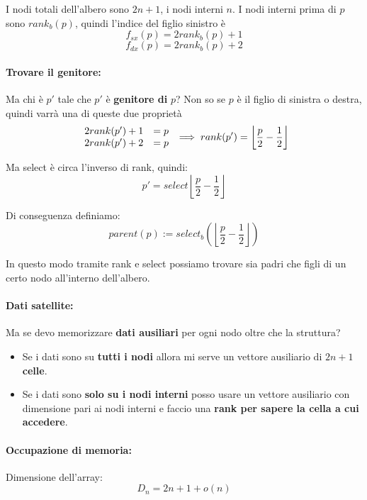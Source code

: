 I nodi totali dell'albero sono $2n+1$, i nodi interni $n$. I nodi interni prima di $p$ sono $ rank_b (p)$, quindi l'indice del figlio sinistro è 
$$ f_{sx} (p) = 2 rank_b (p) + 1 $$
$$ f_{dx} (p) = 2 rank_b (p) + 2 $$

\newpage

\paragraph{Trovare il genitore:} Ma chi è $p'$ tale che $p'$ è \textbf{genitore di} $p$? Non so se $p$ è il figlio di sinistra o destra, quindi varrà una di queste due proprietà
$$
\begin{array}{c c}
	2 rank (p') + 1 & = p \\
	2 rank (p') + 2 & = p
\end{array}
\implies rank (p') = \left\lfloor \frac{p}{2} - \frac{1}{2} \right\rfloor $$

Ma select è circa l'inverso di rank, quindi: 
$$
p' = select \left\lfloor \frac{p}{2} - \frac{1}{2} \right\rfloor
$$

Di conseguenza definiamo:
$$ parent(p) := select_b \left(\left\lfloor \frac{p}{2} - \frac{1}{2} \right\rfloor\right) $$

In questo modo tramite rank e select possiamo trovare sia padri che figli di un certo nodo all'interno dell'albero.\\

\paragraph{Dati satellite:} Ma se devo memorizzare \textbf{dati ausiliari} per ogni nodo oltre che la struttura?
\begin{itemize}
	\item Se i dati sono su \textbf{tutti i nodi} allora mi serve un vettore ausiliario di $2n+1$ \textbf{celle}.\\
	
	\item Se i dati sono \textbf{solo su i nodi interni} posso usare un vettore ausiliario con dimensione pari ai nodi interni e faccio una \textbf{rank per sapere la cella a cui accedere}.\\
\end{itemize}

\paragraph{Occupazione di memoria:} Dimensione dell'array: 
$$D_n = 2n + 1 + o(n)$$

